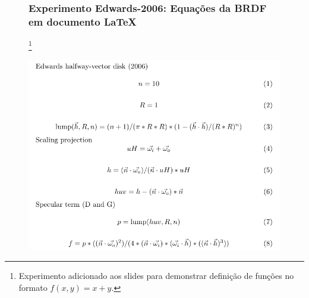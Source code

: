 

\begin{frame}
\begin{figure}
    \frametitle{Experimento Edwards-2006: Equações da BRDF em documento \LaTeX{}}
    \footnote{\tiny{Experimento adicionado aos slides para demonstrar definição de funções no formato $f(x,y) = x+y$.}}
    \begin{center}
        \includegraphics[scale=0.52]{./Imagens/brdfs/edwards-2006.pdf}
    \end{center}
\end{figure}
\end{frame}

